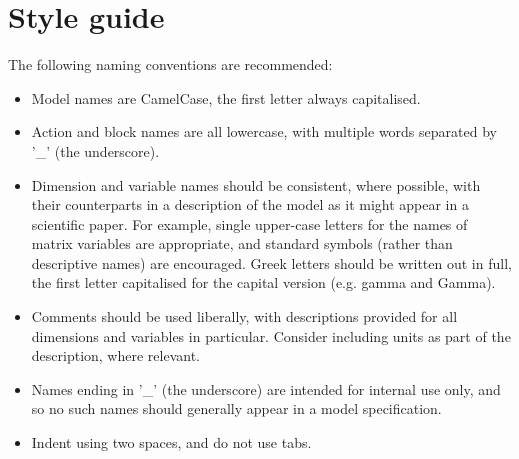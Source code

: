 \section{Style guide\label{Style_guide}}

The following naming conventions are recommended:
\begin{itemize}
\item Model names are CamelCase, the first letter always capitalised.
\item Action and block names are all lowercase, with multiple words separated
  by '\_' (the underscore).
\item Dimension and variable names should be consistent, where possible, with
  their counterparts in a description of the model as it might appear in a
  scientific paper. For example, single upper-case letters for the names of
  matrix variables are appropriate, and standard symbols (rather than
  descriptive names) are encouraged. Greek letters should be written out in
  full, the first letter capitalised for the capital version
  (e.g. \textsf{gamma} and \textsf{Gamma}).
\item Comments should be used liberally, with descriptions provided for all
  dimensions and variables in particular. Consider including units as part of
  the description, where relevant.
\item Names ending in '\_' (the underscore) are intended for internal use
  only, and so no such names should generally appear in a model specification.
\item Indent using two spaces, and do not use tabs.
\end{itemize}
